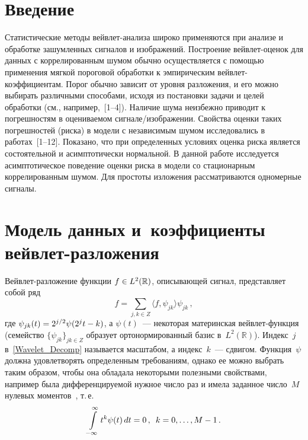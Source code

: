 

      \thispagestyle{headings}

      \begin{multicols}{2}

            \label{st\stat}

\section{Введение}

Статистические методы вейв\-лет-ана\-ли\-за широко применяются при анализе и обработке 
зашумленных сигналов и изображений. \mbox{Построение} вейвлет-оце\-нок 
для данных с коррелированным шумом обычно осуществляется с помощью 
применения мягкой пороговой обработки к эмпирическим вейв\-лет-ко\-эф\-фи\-ци\-ен\-там. 
Порог обычно зависит от уровня разложения, и его можно выбирать различными способами, 
исходя из постановки задачи и целей обработки (см., например,~[1--4]). Наличие шума 
неизбежно приводит к погрешностям в оцениваемом сиг\-на\-ле/изоб\-ра\-же\-нии. 
Свойства оценки таких погрешностей (риска) в модели с независимым шумом исследовались в 
работах~[1--12]. Показано, что при определенных условиях оценка риска является состоятельной 
и асимптотически нормальной. В данной работе исследуется асимптотическое поведение оценки 
риска в модели со стационарным коррелированным шумом. Для простоты изложения рассматриваются 
одномерные сигналы.

\section{Модель данных и~коэффициенты вейвлет-разложения}

Вейвлет-разложение функции $f\hm\in L^2(\mathbb{R})$, описывающей сигнал, представляет 
собой ряд
\begin{equation}
f=\sum\limits_{j,k\in Z}\langle f,\psi_{jk}\rangle\psi_{jk}\,,
\label{Wavelet_Decomp}
\end{equation}
где $\psi_{jk}(t)\hm=2^{j/2}\psi(2^jt-k)$, а $\psi(t)$~--- 
некоторая материнская вейв\-лет-функ\-ция (семейство $\{\psi_{jk}\}_{jk\in Z}$ 
образует ортонормированный базис в~$L^2(\mathbb{R})$). Индекс~$j$ 
в~\eqref{Wavelet_Decomp} называется масштабом, а индекс~$k$~--- сдвигом. 
Функция~$\psi$ должна удовлетворять определенным требованиям, однако ее 
можно выбрать таким образом, чтобы она обладала некоторыми полезными свойствами, 
например была дифференцируемой нужное число раз и имела заданное число~$M$ нулевых 
моментов~\cite{13-she}, т.\,е.
$$\int\limits_{-\infty}^{\infty}t^k\psi(t)\,dt=0\,,\enskip k=0,\ldots,M-1\,.
$$


\end{multicols}
